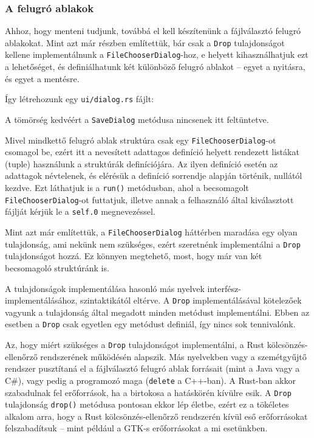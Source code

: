 \subsubsection{A felugró ablakok}

Ahhoz, hogy menteni tudjunk, továbbá el kell készítenünk a fájlválasztó felugró ablakokat.
Mint azt már  részben említettük, bár csak a \texttt{Drop} tulajdonságot
kellene implementálnunk a \texttt{FileChooserDialog}-hoz, e helyett kihasználhatjuk ezt a lehetőséget,
és definiálhatunk két különböző felugró ablakot --
egyet a nyitásra, és egyet a mentésre.

Így létrehozunk egy \texttt{ui/dialog.rs} fájlt:



A tömörség kedvéért a \texttt{SaveDialog} metódusa nincsenek itt feltüntetve.

Mivel mindkettő felugró ablak struktúra csak egy \texttt{FileChooserDialog}-ot csomagol be,
ezért itt a nevesített adattagos definíció helyett rendezett listákat (tuple) használunk
a struktúrák definíciójára.
Az ilyen definíció esetén az adattagok névtelenek, és elérésük a definíció sorrendje alapján történik,
nullától kezdve.
Ezt láthatjuk is a \texttt{run()} metódusban, ahol a becsomagolt \texttt{FileChooserDialog}-ot futtatjuk,
illetve annak a felhasználó által kiválasztott fájlját kérjük le a \texttt{self.0} megnevezéssel.

Mint azt már említettük, a \texttt{FileChooserDialog} háttérben maradása egy olyan tulajdonság,
ami nekünk nem szükséges, ezért szeretnénk implementálni a \texttt{Drop} tulajdonságot hozzá.
Ez könnyen megtehető, most, hogy már van két becsomagoló struktúránk is.



A tulajdonságok implementálása hasonló más nyelvek interfész-implementálásához, szintaktikától eltérve.
A \texttt{Drop} implementálásával kötelezőek vagyunk a tulajdonság által megadott minden metódust implementálni.
Ebben az esetben a \texttt{Drop} csak egyetlen egy metódust definiál, így nincs sok tennivalónk.

Az, hogy miért szükséges a \texttt{Drop} tulajdonságot implementálni, a Rust kölcsönzés-ellenőrző
rendszerének működésén alapszik.
Más nyelvekben vagy a szemétgyűjtő rendszer pusztítaná el a fájlválasztó felugró ablak forrásait
(mint a Java vagy a C\#), vagy pedig a programozó maga (\texttt{delete} a C++-ban).
A Rust-ban akkor szabadulnak fel erőforrások, ha a birtokosa a hatáskörén kívülre esik.
A \texttt{Drop} tulajdonság \texttt{drop()} metódusa pontosan ekkor lép életbe,
ezért ez a tökéletes alkalom arra, hogy a Rust kölcsönzés-ellenőrző rendszerén kívül eső
erőforrásokat felszabadítsuk -- mint például a GTK-s erőforrásokat a mi esetünkben.

